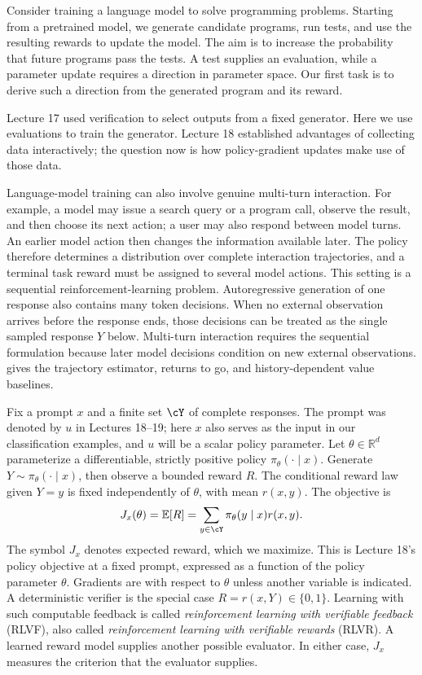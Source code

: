\documentclass[11pt,twoside]{article}
\newcommand{\E}{\mathbb E}
\newcommand{\R}{\mathbb R}
\theoremstyle{definition}
\theoremstyle{remark}
\begin{document}
Consider training a language model to solve programming problems. Starting
from a pretrained model, we generate candidate programs, run tests, and use
the resulting rewards to update the model. The aim is to increase the
probability that future programs pass the tests. A test supplies an
evaluation, while a parameter update requires a direction in parameter
space. Our first task is to derive such a direction from the generated
program and its reward.

Lecture 17 used verification to select outputs from a fixed generator.
Here we use evaluations to train the generator. Lecture 18 established
advantages of collecting data interactively; the question now is how
policy-gradient updates make use of those data.

Language-model training can also involve genuine multi-turn interaction.
For example, a model may issue a search query or a program call, observe the
result, and then choose its next action; a user may also respond between model
turns. An earlier model action then changes the information available later.
The policy therefore determines a distribution over complete interaction
trajectories, and a terminal task reward must be assigned to several model
actions. This setting is a sequential reinforcement-learning problem.
Autoregressive generation of one response also contains many token decisions.
When no external observation arrives before the response ends, those decisions
can be treated as the single sampled response $Y$ below. Multi-turn interaction
requires the sequential formulation because later model decisions condition on
new external observations.  gives the trajectory estimator,
returns to go, and history-dependent value baselines.

Fix a prompt $x$ and a finite set $\cY$ of complete responses. The prompt
was denoted by $u$ in Lectures 18--19; here $x$ also serves as the input
in our classification examples, and $u$ will be a scalar policy parameter.
Let $\theta\in\R^d$ parameterize a differentiable, strictly positive policy
$\pi_\theta(\cdot\mid x)$. Generate $Y\sim\pi_\theta(\cdot\mid x)$,
then observe a bounded reward $R$. The conditional reward law given $Y=y$
is fixed independently of $\theta$, with mean $r(x,y)$. The objective is
\begin{equation}
 J_x(\theta)=\E[R]=\sum_{y\in\cY}\pi_\theta(y\mid x)r(x,y).
 \label{eq:reward-objective}
\end{equation}
The symbol $J_x$ denotes expected reward, which we maximize. This is
Lecture 18's policy objective at a fixed prompt, expressed as a function
of the policy parameter $\theta$. Gradients are with respect to $\theta$
unless another variable is indicated.
A deterministic verifier is the special case $R=r(x,Y)\in\{0,1\}$.
Learning with such computable feedback is called \emph{reinforcement learning
with verifiable feedback} (RLVF), also called \emph{reinforcement learning with
verifiable rewards} (RLVR). A learned reward model supplies another
possible evaluator. In either case, $J_x$ measures the criterion that the
evaluator supplies.
\end{document}
